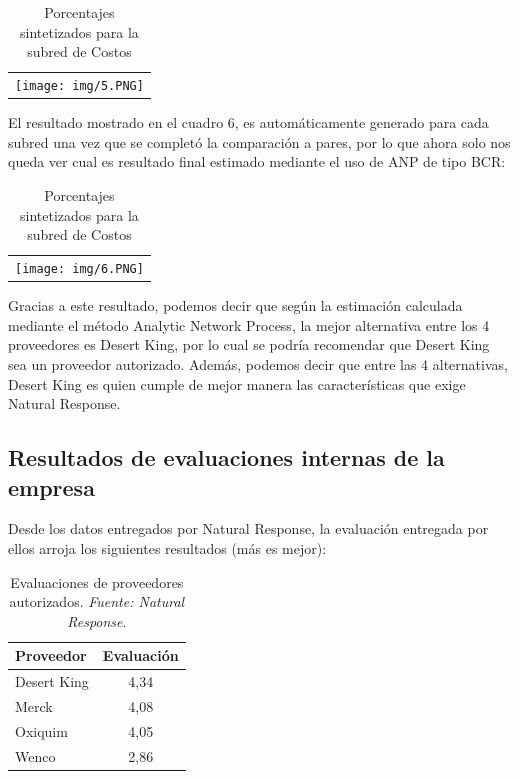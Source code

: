 \documentclass[12pt,letterpaper]{article}
\begin{document}
\begin{table}[h]
\centering
\begin{tabular}{c}
\texttt{[image: img/5.PNG]}
\end{tabular}
\caption{Porcentajes sintetizados para la subred de Costos}
\label{tab:Porcentajes sintetizados para la subred de Costos}
\end{table}

El resultado mostrado en el cuadro 6, es automáticamente generado para cada subred una vez que se completó la comparación a pares, por lo que ahora solo nos queda ver cual es resultado final estimado mediante el uso de ANP de tipo BCR:

\begin{table}[h]
\centering
\begin{tabular}{c}
\texttt{[image: img/6.PNG]}
\end{tabular}
\caption{Porcentajes sintetizados para la subred de Costos}
\label{tab:Porcentajes sintetizados para la subred de Costos}
\end{table}

Gracias a este resultado, podemos decir que según la estimación calculada mediante el método Analytic Network Process, la mejor alternativa entre los 4 proveedores es Desert King, por lo cual se podría recomendar que Desert King sea un proveedor autorizado. Además, podemos decir que entre las 4 alternativas, Desert King es quien cumple de mejor manera las características que exige Natural Response.

\newpage
\subsection{Resultados de evaluaciones internas de la empresa}
Desde los datos entregados por Natural Response, la evaluación entregada por ellos arroja los siguientes resultados (más es mejor):

\begin{table}[h]
\centering
\begin{tabular}{|l|c|}
\hline
\textbf{Proveedor} & \textbf{Evaluación}\\
\hline
Desert King & 4,34\\
\hline
Merck & 4,08\\
\hline
Oxiquim & 4,05\\
\hline
Wenco & 2,86\\
\hline
\end{tabular}
\caption{Evaluaciones de proveedores autorizados. \textit{Fuente: Natural Response}.}
\label{tab:tabla de evaluacion}
\end{table}
\end{document}
